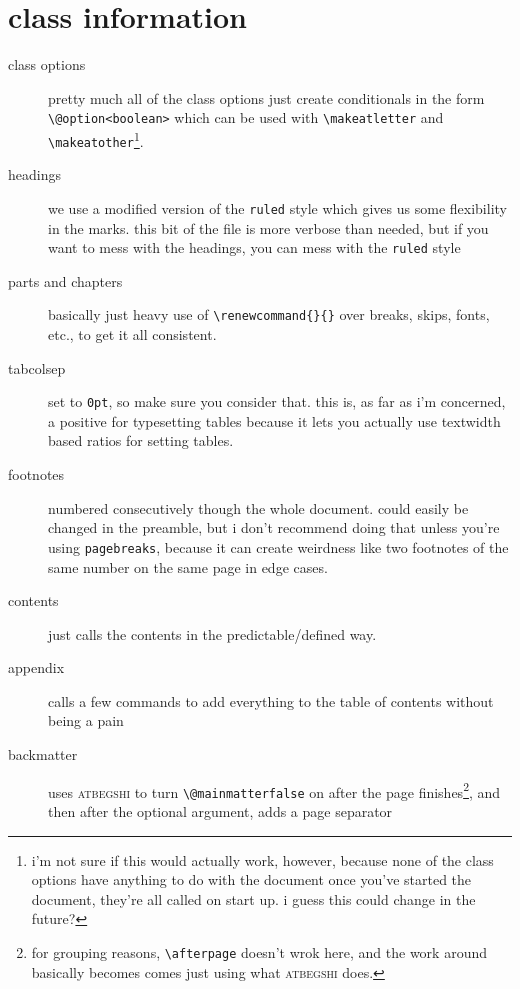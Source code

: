 \documentclass[lowerhead,12pt]{aesthetic}
\begin{document}
\section[class information]{class information\protect\footnotemark}\label{sec:aesinfo}
\begin{description}
    \item[class options] pretty much all of the class options just create conditionals in the form \verb|\@option<boolean>| which can be used with \verb|\makeatletter| and \verb|\makeatother|\footnote{i'm not sure if this would actually work, however, because none of the class options have anything to do with the document once you've started the document, they're all called on start up. i guess this could change in the future?}.
    \item[headings] we use a modified version of the \texttt{ruled} style which gives us some flexibility in the marks. this bit of the file is more verbose than needed, but if you want to mess with the headings, you can mess with the \texttt{ruled} style
    \item[parts and chapters] basically just heavy use of \verb|\renewcommand{}{}| over breaks, skips, fonts, etc., to get it all consistent.
    \item[tabcolsep] set to \texttt{0pt}, so make sure you consider that. this is, as far as i'm concerned, a positive for typesetting tables because it lets you actually use textwidth based ratios for setting tables.
    \item[footnotes] numbered consecutively though the whole document. could easily be changed in the preamble, but i don't recommend doing that unless you're using \texttt{pagebreaks}, because it can create weirdness like two footnotes of the same number on the same page in edge cases.
    \item[contents] just calls the contents in the predictable/defined way.
    \item[appendix] calls a few commands to add everything to the table of contents without being a pain
    \item[backmatter] uses {\scshape\ttfamily atbegshi} to turn \texttt{\textbackslash @mainmatterfalse} on after the page finishes\footnote{for grouping reasons, \texttt{\textbackslash afterpage} doesn't wrok here, and the work around basically becomes comes just using what {\scshape\ttfamily atbegshi} does.}, and then after the optional argument, adds a page separator
\end{description}
\end{document}
